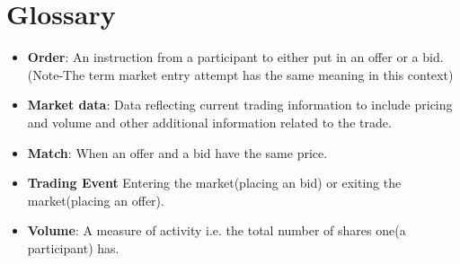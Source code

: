 \documentclass[12pt]{article}
\begin{document}
	\clearpage	
	\newpage				
	\section{Glossary}	
		\begin{itemize}
			\item \textbf{Order}: An instruction from a participant to either put in an offer or a bid.(Note-The term market entry attempt has the same meaning in this context)
			\item \textbf{Market data}: Data reflecting current trading information to include pricing and volume and other additional information related to the trade.
			\item \textbf{Match}: When an offer and a bid have the same price.
			\item \textbf{Trading Event} Entering the market(placing an bid) or exiting the market(placing an offer). 
			\item \textbf{Volume}: A measure of activity i.e. the total number of shares one(a participant) has. 
		\end{itemize}				    			    			    		
\end{document}
